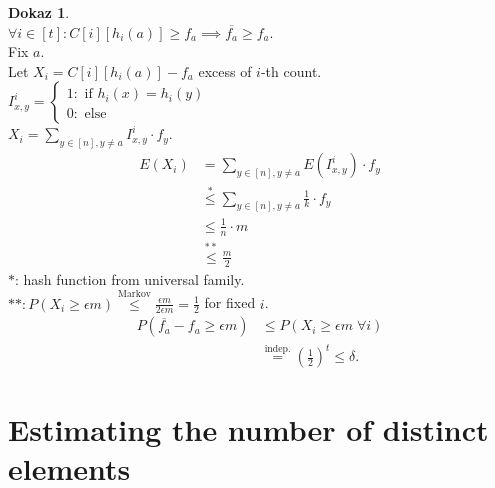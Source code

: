 \documentclass[a4paper, 12pt]{book}
\theoremstyle{definition}
\newtheorem{pro}[counter]{Dokaz}
\theoremstyle{remark}
\begin{document}
\begin{pro} \text{} \\
  $\forall i \in [t]: C[i][h_i(a)] \geq f_a \implies \overline{f_a} \geq f_a$. \\
  Fix $a$. \\
  Let $X_i = C[i][h_i(a)] - f_a$ excess of $i$-th count. \\
  $I_{x,y}^i = \begin{cases}
    1: \text{ if } h_i(x) = h_i(y) \\
    0: \text{ else}
  \end{cases}$ \\
  $X_i = \sum_{y \in [n], y \neq a} I_{x,y}^i \cdot f_y$.
  \begin{align*}
    E(X_i) &= \sum_{y \in [n], y \neq a} E(I_{x,y}^i) \cdot f_y \\
    &\stackrel{*}{\leq} \sum_{y \in [n], y \neq a} \frac{1}{k} \cdot f_y \\
    &\leq \frac{1}{n} \cdot m \\
    &\stackrel{**}{\leq} \frac{m}{2}
  \end{align*}
  $*$: hash function from universal family. \\
  $**: P(X_i \geq \epsilon m) \stackrel{\text{Markov}}{\leq} \frac{\epsilon m}{2 \epsilon m} = \frac{1}{2}$
  for fixed $i$. \\
  \begin{align*}
    P(\overline{f_a} - f_a \geq \epsilon m) &\leq P(X_i \geq \epsilon m \; \forall i) \\
    &\stackrel{\text{indep.}}{=} \left(\frac{1}{2}\right)^t \leq \delta.
  \end{align*}
\end{pro}



\section{Estimating the number of distinct elements}
\end{document}
